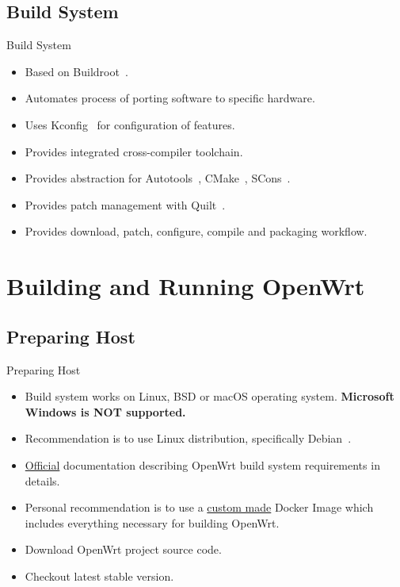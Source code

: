 \subsection{Build System}
\begin{frame}{Build System}
    \pause
    \begin{itemize}[<+-|alert@+>]
        \item Based on Buildroot~\cite{buildroot}.
        \item Automates process of porting software to specific hardware.
        \item Uses Kconfig~\cite{linux-kconfig} for configuration of features.
        \item Provides integrated cross-compiler toolchain.
        \item Provides abstraction for Autotools~\cite{gnu-autotools}, CMake~\cite{kitware-cmake}, SCons~\cite{scons}.
        \item Provides patch management with Quilt~\cite{fsf-quilt}.
        \item Provides download, patch, configure, compile and packaging workflow.
    \end{itemize}
\end{frame}

\section{Building and Running OpenWrt}

\subsection{Preparing Host}
\begin{frame}{Preparing Host}
    \pause
    \begin{itemize}[<+-|alert@+>]
        \item Build system works on Linux, BSD or macOS operating system. \textbf{Microsoft Windows is NOT supported.}
        \item Recommendation is to use Linux distribution, specifically Debian~\cite{debian-website}.
        \item \href{https://openwrt.org/docs/guide-developer/build-system/install-buildsystem}{Official} documentation describing OpenWrt build system requirements in details.
        \item Personal recommendation is to use a \href{https://github.com/hvarga/openwrt-application-development/blob/master/presentation/resources/Dockerfile}{custom made} Docker Image which includes everything necessary for building OpenWrt.
        \item Download OpenWrt project source code. \\
        \item Checkout latest stable version. \\
    \end{itemize}
\end{frame}

